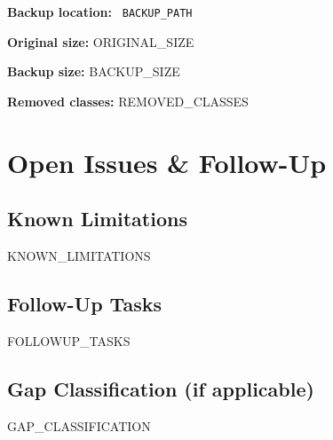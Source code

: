 \documentclass[11pt,a4paper]{article}
\begin{document}
\noindent\textbf{Backup location:} \texttt{ {{BACKUP_PATH}} }

\noindent\textbf{Original size:} {{ORIGINAL_SIZE}}

\noindent\textbf{Backup size:} {{BACKUP_SIZE}}

\noindent\textbf{Removed classes:} {{REMOVED_CLASSES}}


\section{Open Issues \& Follow-Up}

\subsection{Known Limitations}
\begin{itemize}
{{KNOWN_LIMITATIONS}}
\end{itemize}

\subsection{Follow-Up Tasks}
\begin{itemize}
{{FOLLOWUP_TASKS}}
\end{itemize}

\subsection{Gap Classification (if applicable)}
{{GAP_CLASSIFICATION}}

\end{document}
